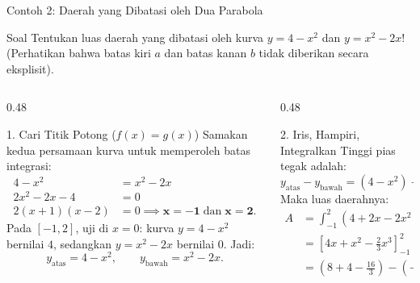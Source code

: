 \documentclass[aspectratio=43,10pt]{beamer}
\begin{document}
\begin{frame}{Contoh 2: Daerah yang Dibatasi oleh Dua Parabola}
    \begin{exampleblock}{Soal}
        \scriptsize
        Tentukan luas daerah yang dibatasi oleh kurva $y = 4 - x^2$ dan $y = x^2 - 2x$! (Perhatikan bahwa batas kiri $a$ dan batas kanan $b$ tidak diberikan secara eksplisit).
    \end{exampleblock}

    \begin{columns}[T]
        \begin{column}{0.48\textwidth}
            \begin{block}{1. Cari Titik Potong ($f(x) = g(x)$)}
                \scriptsize\abovedisplayskip=2pt\belowdisplayskip=2pt
                Samakan kedua persamaan kurva untuk memperoleh batas integrasi:
                \begin{align*}
                    4 - x^2 &= x^2 - 2x\\
                    2x^2 - 2x - 4 &= 0\\
                    2(x + 1)(x - 2) &= 0 \implies \mathbf{x = -1} \;\text{dan}\; \mathbf{x = 2}.
                \end{align*}
                Pada $[-1, 2]$, uji di $x = 0$: kurva $y = 4 - x^2$ bernilai $4$, sedangkan $y = x^2 - 2x$ bernilai $0$. Jadi:
                $$y_{\text{atas}} = 4 - x^2, \qquad y_{\text{bawah}} = x^2 - 2x.$$
            \end{block}
        \end{column}

        \begin{column}{0.48\textwidth}
            \begin{alertblock}{2. Iris, Hampiri, Integralkan}
                \scriptsize\abovedisplayskip=2pt\belowdisplayskip=2pt
                Tinggi pias tegak adalah:
                $$y_{\text{atas}} - y_{\text{bawah}} = (4 - x^2) - (x^2 - 2x) = 4 + 2x - 2x^2.$$
                Maka luas daerahnya:
                \begin{align*}
                    A &= \int_{-1}^{2} (4 + 2x - 2x^2)\,dx\\
                    &= \left[4x + x^2 - \frac{2}{3}x^3\right]_{-1}^{2}\\
                    &= \left(8 + 4 - \frac{16}{3}\right) - \left(-4 + 1 + \frac{2}{3}\right) = \mathbf{9}.
                \end{align*}
            \end{alertblock}
        \end{column}
    \end{columns}
\end{frame}
\end{document}
